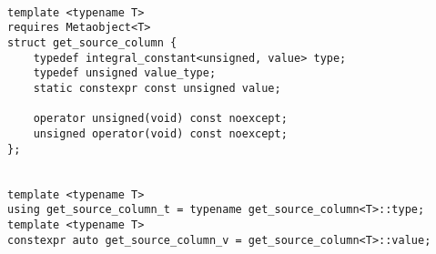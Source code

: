 \begin{verbatim}

template <typename T>
requires Metaobject<T>
struct get_source_column {
	typedef integral_constant<unsigned, value> type;
	typedef unsigned value_type;
	static constexpr const unsigned value;

	operator unsigned(void) const noexcept;
	unsigned operator(void) const noexcept;
};


template <typename T>
using get_source_column_t = typename get_source_column<T>::type;
template <typename T>
constexpr auto get_source_column_v = get_source_column<T>::value;

\end{verbatim}
